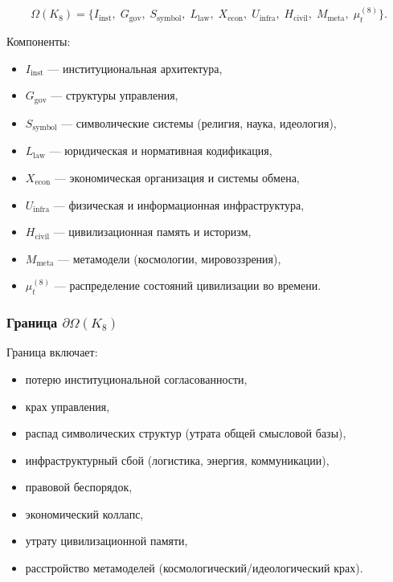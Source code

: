 \[
\Omega(K_8)=
\{
I_{\mathrm{inst}},\;
G_{\mathrm{gov}},\;
S_{\mathrm{symbol}},\;
L_{\mathrm{law}},\;
X_{\mathrm{econ}},\;
U_{\mathrm{infra}},\;
H_{\mathrm{civil}},\;
M_{\mathrm{meta}},\;
\mu^{(8)}_t
\}.
\]

Компоненты:
\begin{itemize}
    \item $I_{\mathrm{inst}}$ — институциональная архитектура,
    \item $G_{\mathrm{gov}}$ — структуры управления,
    \item $S_{\mathrm{symbol}}$ — символические системы (религия, наука, идеология),
    \item $L_{\mathrm{law}}$ — юридическая и нормативная кодификация,
    \item $X_{\mathrm{econ}}$ — экономическая организация и системы обмена,
    \item $U_{\mathrm{infra}}$ — физическая и информационная инфраструктура,
    \item $H_{\mathrm{civil}}$ — цивилизационная память и историзм,
    \item $M_{\mathrm{meta}}$ — метамодели (космологии, мировоззрения),
    \item $\mu^{(8)}_t$ — распределение состояний цивилизации во времени.
\end{itemize}

\subsubsection{Граница \texorpdfstring{$\partial\Omega(K_8)$}{$\partial\Omega(K_8)$}}

Граница включает:
\begin{itemize}
    \item потерю институциональной согласованности,
    \item крах управления,
    \item распад символических структур (утрата общей смысловой базы),
    \item инфраструктурный сбой (логистика, энергия, коммуникации),
    \item правовой беспорядок,
    \item экономический коллапс,
    \item утрату цивилизационной памяти,
    \item расстройство метамоделей (космологический/идеологический крах).
\end{itemize}

